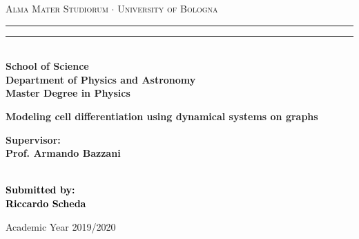 \begin{titlepage}
\begin{center}
{{\Large{\textsc{Alma Mater Studiorum $\cdot$ University of  Bologna}}}}
\rule[0.1cm]{15.8cm}{0.1mm}
\rule[0.5cm]{15.8cm}{0.6mm}
\\\vspace{3mm}
{\small{\bf School of Science \\
Department of Physics and Astronomy\\
Master Degree in Physics}}
\end{center}

\vspace{23mm}

\begin{center}
    \LARGE{\bf Modeling cell differentiation using dynamical systems on graphs}\\
\end{center}

\vspace{50mm} \par \noindent

\begin{minipage}[t]{0.47\textwidth}
{\large{\bf Supervisor: \vspace{2mm}\\
Prof. Armando Bazzani}\\\\}
\end{minipage}
%
\hfill
%
\begin{minipage}[t]{0.47\textwidth}\raggedleft
    \textcolor{black}{
        {\large{\bf Submitted by:
            \vspace{2mm}\\
            {Riccardo Scheda}}}
    }
\end{minipage}

\vspace{30mm}

\begin{center}
Academic Year 2019/2020
\end{center}
\end{titlepage}
